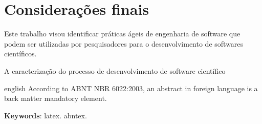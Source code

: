 \documentclass[
	article,			%
	11pt,				%
	oneside,			%
	a4paper,			%
	english,			%
	brazil,				%
	sumario=tradicional
	]{abntex2}
\begin{document}
\section*{Considerações finais}
Este trabalho visou identificar práticas ágeis de engenharia de software que podem ser utilizadas por pesquisadores para o desenvolvimento de softwares científicos.

A caracterização do processo de desenvolvimento de software científico 

\postextual



\emptythanks
\maketitle

\renewcommand{\resumoname}{Abstract}
\begin{resumoumacoluna}
 \begin{otherlanguage*}{english}
   According to ABNT NBR 6022:2003, an abstract in foreign language is a back
   matter mandatory element.

   \vspace{\onelineskip}
 
   \noindent
   \textbf{Keywords}: latex. abntex.
 \end{otherlanguage*}  
\end{resumoumacoluna}




%
%

\end{document}
